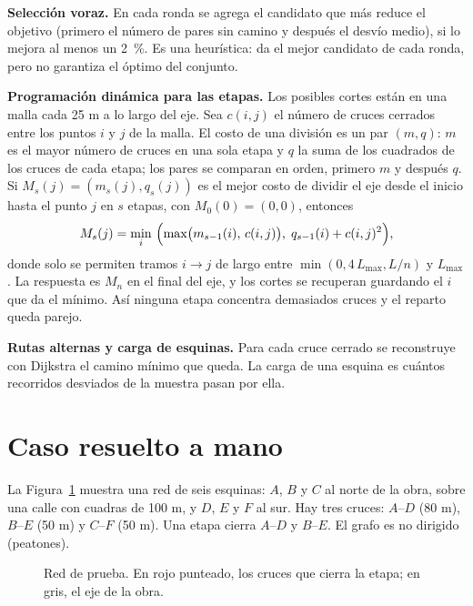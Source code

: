 \documentclass[12pt,letterpaper]{article}
\begin{document}
\textbf{Selección voraz.} En cada ronda se agrega el candidato que más reduce el objetivo (primero el número de pares sin camino y después el desvío medio), si lo mejora al menos un 2~\%. Es una heurística: da el mejor candidato de cada ronda, pero no garantiza el óptimo del conjunto.

\textbf{Programación dinámica para las etapas.} Los posibles cortes están en una malla cada 25 m a lo largo del eje. Sea $c(i,j)$ el número de cruces cerrados entre los puntos $i$ y $j$ de la malla. El costo de una división es un par $(m,q)$: $m$ es el mayor número de cruces en una sola etapa y $q$ la suma de los cuadrados de los cruces de cada etapa; los pares se comparan en orden, primero $m$ y después $q$. Si $M_s(j)=(m_s(j),q_s(j))$ es el mejor costo de dividir el eje desde el inicio hasta el punto $j$ en $s$ etapas, con $M_0(0)=(0,0)$, entonces
\begin{equation}
M_s(j)=\min_{i}\ \Bigl(\max\bigl(m_{s-1}(i),\,c(i,j)\bigr),\; q_{s-1}(i)+c(i,j)^2\Bigr),
\end{equation}
donde solo se permiten tramos $i\to j$ de largo entre $\min(0{,}4\,L_{\max},L/n)$ y $L_{\max}$. La respuesta es $M_n$ en el final del eje, y los cortes se recuperan guardando el $i$ que da el mínimo. Así ninguna etapa concentra demasiados cruces y el reparto queda parejo.

\textbf{Rutas alternas y carga de esquinas.} Para cada cruce cerrado se reconstruye con Dijkstra el camino mínimo que queda. La carga de una esquina es cuántos recorridos desviados de la muestra pasan por ella.

\section{Caso resuelto a mano}
La Figura~\ref{fig:mano} muestra una red de seis esquinas: $A$, $B$ y $C$ al norte de la obra, sobre una calle con cuadras de 100 m, y $D$, $E$ y $F$ al sur. Hay tres cruces: $A$--$D$ (80 m), $B$--$E$ (50 m) y $C$--$F$ (50 m). Una etapa cierra $A$--$D$ y $B$--$E$. El grafo es no dirigido (peatones).

\begin{figure}[H]
\centering
{}
\caption{Red de prueba. En rojo punteado, los cruces que cierra la etapa; en gris, el eje de la obra.}
\label{fig:mano}
\end{figure}
\end{document}
